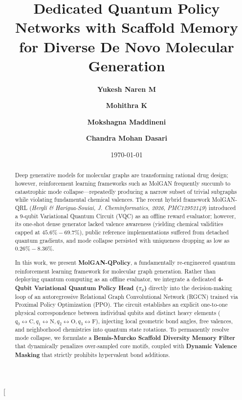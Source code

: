 \documentclass[10pt,twocolumn,a4paper]{article}
\title{\LARGE \textbf{Dedicated Quantum Policy Networks with Scaffold Memory for Diverse De Novo Molecular Generation}}
\author[1,\dag,*]{\textbf{Yukesh Naren M}}
\author[1,\dag]{\textbf{Mohithra K}}
\author[1,\dag]{\textbf{Mokshagna Maddineni}}
\author[1]{\textbf{Chandra Mohan Dasari}}
\affil[1]{\small Department of Computer Science and Engineering, Indian Institute of Information Technology Design and Manufacturing Kurnool (IIITDM Kurnool), Kurnool, Andhra Pradesh 518008, India}
\date{\small \today}
\begin{document}
\twocolumn[
  \begin{@twocolumnfalse}
    \maketitle
    \begingroup
    \renewcommand\thefootnote{\dag}
    \renewcommand\thefootnote{*}
    \endgroup

    \begin{abstract}
    \noindent Deep generative models for molecular graphs are transforming rational drug design; however, reinforcement learning frameworks such as MolGAN frequently succumb to catastrophic mode collapse---repeatedly producing a narrow subset of trivial subgraphs while violating fundamental chemical valences. The recent hybrid framework MolGAN-QRL (\textit{Hergli \& Harigua-Souiai, J. Cheminformatics, 2026, PMC12952149}) introduced a 9-qubit Variational Quantum Circuit (VQC) as an offline reward evaluator; however, its one-shot dense generator lacked valence awareness (yielding chemical validities capped at $45.6\% - 69.7\%$), public reference implementations suffered from detached quantum gradients, and mode collapse persisted with uniqueness dropping as low as $0.26\% - 8.36\%$.
    
    In this work, we present \textbf{MolGAN-QPolicy}, a fundamentally re-engineered quantum reinforcement learning framework for molecular graph generation. Rather than deploying quantum computing as an offline evaluator, we integrate a dedicated \textbf{4-Qubit Variational Quantum Policy Head ($\pi_\theta$)} directly into the decision-making loop of an autoregressive Relational Graph Convolutional Network (RGCN) trained via Proximal Policy Optimization (PPO). The circuit establishes an explicit one-to-one physical correspondence between individual qubits and distinct heavy elements ($q_0 \leftrightarrow \text{C}, q_1 \leftrightarrow \text{N}, q_2 \leftrightarrow \text{O}, q_3 \leftrightarrow \text{F}$), injecting local geometric bond angles, free valences, and neighborhood chemistries into quantum state rotations. To permanently resolve mode collapse, we formulate a \textbf{Bemis-Murcko Scaffold Diversity Memory Filter} that dynamically penalizes over-sampled core motifs, coupled with \textbf{Dynamic Valence Masking} that strictly prohibits hypervalent bond additions.
    

\end{abstract}
\end{@twocolumnfalse}
\end{document}
